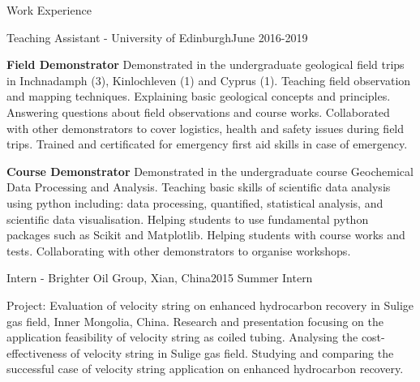 \documentclass{resume} %
\newenvironment{indentpar}[1]%
  {\begin{list}{}%
          {\setlength{\leftmargin}{#1}}%
          \item[]%
  }
  {\end{list}}
\begin{document}
\begin{rSection}{Work Experience}

\begin{rSubsection}{Teaching Assistant - University of Edinburgh}{June 2016-2019}{}

\begin{indentpar}{0.5cm}
\textbf{Field Demonstrator} Demonstrated in the undergraduate geological field trips in Inchnadamph (3), Kinlochleven (1) and Cyprus (1). Teaching field observation and mapping techniques. Explaining basic geological concepts and principles. Answering questions about field observations and course works. Collaborated with other demonstrators to cover logistics, health and safety issues during field trips. Trained and certificated for emergency first aid skills in case of emergency.

\textbf{Course Demonstrator} Demonstrated in the undergraduate course Geochemical Data Processing and Analysis. Teaching basic skills of scientific data analysis using python including: data processing, quantified, statistical analysis, and scientific data visualisation. Helping students to use fundamental python packages such as Scikit and Matplotlib. Helping students with course works and tests. Collaborating with other demonstrators to organise workshops.
\end{indentpar}
\end{rSubsection}

\begin{rSubsection}{Intern - Brighter Oil Group, Xian, China}{2015 Summer Intern}{}

\begin{indentpar}{0.5cm}
Project: Evaluation of velocity string on enhanced hydrocarbon recovery in Sulige gas field, Inner Mongolia, China. Research and presentation focusing on the application feasibility of velocity string as coiled tubing. Analysing the cost-effectiveness of velocity string in Sulige gas field. Studying and comparing the successful case of velocity string application on enhanced hydrocarbon recovery.
\end{indentpar}

\end{rSubsection}
\end{rSection}
\end{document}
